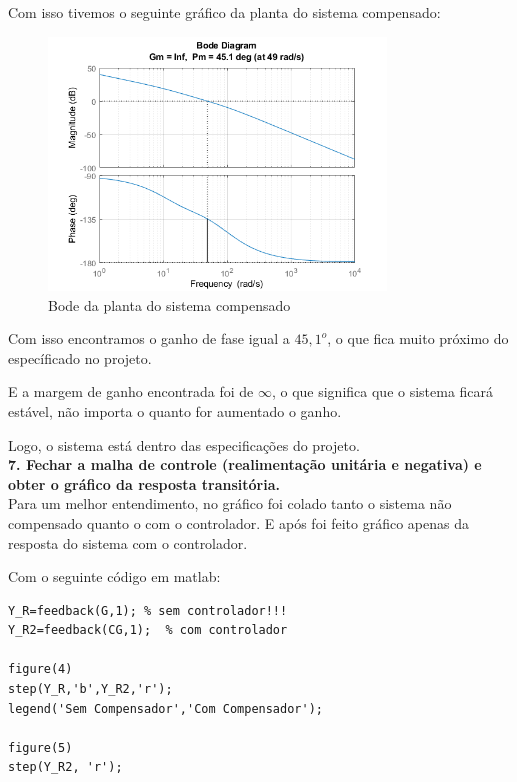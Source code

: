 Com isso tivemos o seguinte gráfico da planta do sistema compensado:

\begin{figure}[H]
  \centering
  \includegraphics[width=0.8\textwidth]{images/fig4.png}
  \caption{Bode da planta do sistema compensado}
\end{figure}

Com isso encontramos o ganho de fase igual a $45,1^o$, o que fica muito próximo do específicado no projeto.

E a margem de ganho encontrada foi de $\infty$, o que significa que o sistema ficará estável, não importa o quanto for aumentado o ganho.

{\color{red} Logo, o sistema está dentro das especificações do projeto.}\\


\noindent \textbf{7. Fechar a malha de controle (realimentação unitária e negativa) e obter o gráfico da resposta transitória.}\\

Para um melhor entendimento, no gráfico foi colado tanto o sistema não compensado quanto o com o controlador. E após foi feito gráfico apenas da resposta do sistema com o controlador.

\noindent Com o seguinte código em matlab:

\begin{lstlisting}[style=matlab]
Y_R=feedback(G,1); % sem controlador!!!
Y_R2=feedback(CG,1);  % com controlador

figure(4)
step(Y_R,'b',Y_R2,'r');
legend('Sem Compensador','Com Compensador');

figure(5)
step(Y_R2, 'r');
\end{lstlisting}\vspace{0.2cm}

